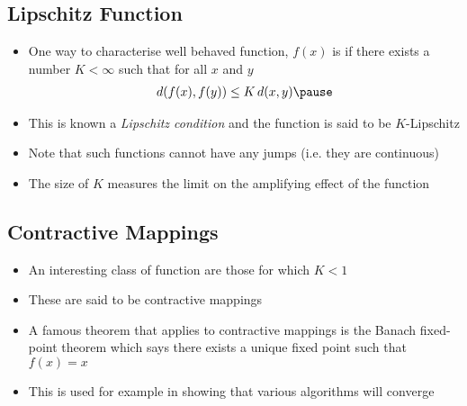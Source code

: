 
\begin{slide}
\section{Lipschitz Function}

\begin{PauseHighLight}
  \begin{itemize}
  \item One way to characterise well behaved function, $f(x)$ is if there
    exists a number $K<\infty$ such that for all $x$ and $y$
    \begin{align*}
      d(f(x), f(y)) \leq K\, d(x,y)\pause
    \end{align*}
  \item This is known a \emph{Lipschitz condition} and the function is
    said to be $K$-Lipschitz\pause
  \item Note that such functions cannot have any jumps (i.e. they are
    continuous)\pause
  \item The size of $K$ measures the limit on the amplifying effect of
    the function\pause
  \end{itemize}
\end{PauseHighLight}

\end{slide}


\begin{slide}
\section{Contractive Mappings}

\begin{PauseHighLight}
  \begin{itemize}
  \item An interesting class of function are those for which
    $K<1$\pause
  \item These are said to be contractive mappings\pause
  \item A famous theorem that applies to contractive mappings is the
    Banach fixed-point theorem which says there exists a unique fixed
    point such that $f(x) = x$\pause
  \item This is used for example in showing that various algorithms
    will converge\pause
  \end{itemize}
\end{PauseHighLight}

\end{slide}



